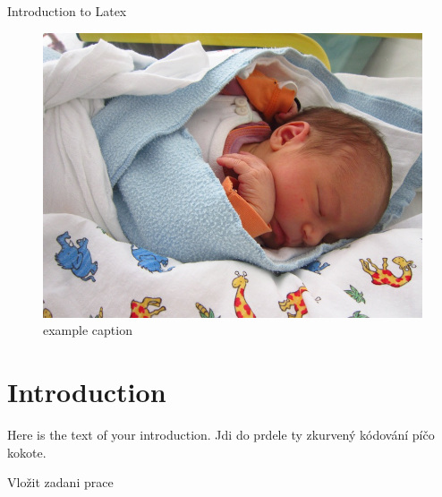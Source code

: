 \documentclass [a4paper,12pt,twoside,notitlepage,openright]{report} %
\def \cestaFiles {00_Chapters/}
\begin{document}
\pagestyle{empty}                       %
\BookHeadDP
\cleardoublepage


Introduction to Latex


\begin{figure}
   \centering
   \includegraphics{example.jpg} %
   \caption{example caption}
   \label{fig:example}
\end{figure}

\section{Introduction}
Here is the text of your introduction. Jdi do prdele ty zkurvený kódování píčo kokote.
   
   
\pagestyle{plain}                       %
\newpage


\cleardoublepage


\cleardoublepage


Vložit zadani prace
\cleardoublepage


\setcounter{secnumdepth}{4}             %
\setcounter{tocdepth}{4}                %
\tableofcontents
\cleardoublepage
\end{document}
